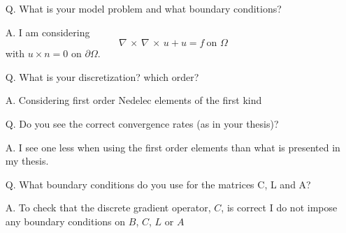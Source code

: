 \documentclass{article}
\begin{document}
\begin{itemize}
    \item[Q.] What is your model problem and what boundary conditions?
    \item[A.] I am considering
    $$ \nabla \, \times \, \nabla \, \times \, u + u = f \ \mbox{on } \Omega$$
    with $u\times n =0$ on $\partial \Omega$.

\vspace{4mm}

    \item[Q.] What is your discretization? which order?
    \item[A.] Considering first order Nedelec elements of the first kind

\vspace{4mm}

    \item[Q.] Do you see the correct convergence rates (as in your thesis)?
    \item[A.] I see one less when using the first order elements than what is presented in my thesis.

\vspace{4mm}

    \item[Q.] What boundary conditions do you use for the matrices C, L and A?
    \item[A.] To check that the discrete gradient operator, $C$, is correct I do not impose any boundary conditions on $B$, $C$, $L$ or $A$
\end{itemize}
\end{document}
